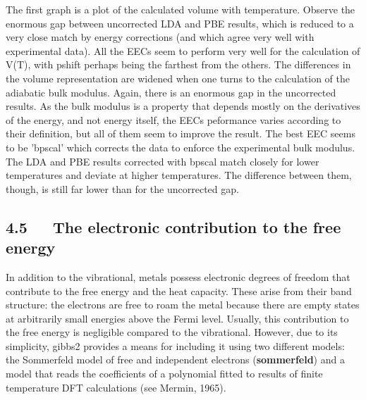 \documentclass[a4paper]{article}
\begin{document}
\noindent{}

The first graph is a plot of the calculated volume with
temperature. Observe the enormous gap between uncorrected LDA and PBE
results, which is reduced to a very close match by energy
corrections (and which agree very well with experimental data). All
the EECs seem to perform very well for the calculation of V(T), with
pshift perhaps being the farthest from the others. The differences in
the volume representation are widened when one turns to the
calculation of the adiabatic bulk modulus. Again, there is an enormous
gap in the uncorrected results. As the bulk modulus is a property that
depends mostly on the derivatives of the energy, and not energy
itself, the EECs peformance varies according to their definition, but
all of them seem to improve the result. The best EEC seems to be
'bpscal' which corrects the data to enforce the experimental bulk
modulus. The LDA and PBE results corrected with bpscal match closely
for lower temperatures and deviate at higher temperatures. The
difference between them, though, is still far lower than for the
uncorrected gap.


\subsection{4.5~~~The electronic contribution to the free energy%
  \label{the-electronic-contribution-to-the-free-energy}%
}

In addition to the vibrational, metals possess electronic degrees of
freedom that contribute to the free energy and the heat
capacity. These arise from their band structure: the electrons are
free to roam the metal because there are empty states at arbitrarily
small energies above the Fermi level. Usually, this contribution to
the free energy is negligible compared to the vibrational. However,
due to its simplicity, gibbs2 provides a means for including it using
two different models: the Sommerfeld model of free and independent
electrons (\textbf{sommerfeld}) and a model that reads the coefficients of
a polynomial fitted to results of finite temperature DFT calculations
(see Mermin, 1965).
\end{document}
